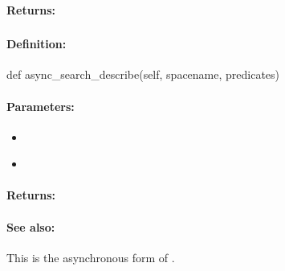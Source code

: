 \paragraph{Returns:}


\pagebreak
\subsubsection{}
\label{api:python:async_search_describe}


\paragraph{Definition:}
\begin{pythoncode}
def async_search_describe(self, spacename, predicates)
\end{pythoncode}

\paragraph{Parameters:}
\begin{itemize}[noitemsep]
\item {}\\

\item {}\\

\end{itemize}

\paragraph{Returns:}


\paragraph{See also:}  This is the asynchronous form of .

\pagebreak
\subsubsection{}
\label{api:python:sorted_search}


